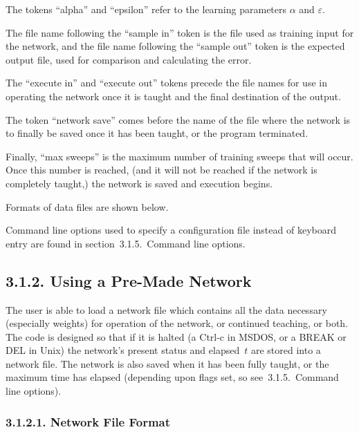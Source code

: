 \documentclass[12pt]{report}
\begin{document}
The tokens ``alpha'' and ``epsilon'' refer to the learning
parameters $\alpha$ and $\varepsilon$.

The file name following the ``sample in'' token is the file used as
training input for the network, and the file name following the
``sample out'' token is the expected output file, used for
comparison and calculating the error.

The ``execute in'' and ``execute out'' tokens precede the file names
for use in operating the network once it is taught and the
final destination of the output.

The token ``network save'' comes before the name of the file where
the network is to finally be saved once it has been taught, or the
program terminated.

Finally, ``max sweeps'' is the maximum number of training sweeps
that will occur.
Once this number is reached, (and it will not be reached if the
network is completely taught,) the network is saved and
execution begins.

Formats of data files are shown below.

Command line options used to specify a configuration file instead of
keyboard entry are found in section~3.1.5.\ Command line options.

\subsection{3.1.2. Using a Pre-Made Network}

The user is able to load a network file which contains all the data
necessary (especially weights) for operation of
the network, or continued teaching, or both.
The code is designed so that if it is halted (a Ctrl-c in MSDOS, or a
BREAK or DEL in Unix) the network's present status and elapsed~$t$ are
stored into a network file.
The network is also saved when it has been fully taught, or the
maximum time has elapsed (depending upon flags set, so see~3.1.5.\
Command line options).

\subsubsection{3.1.2.1. Network File Format}
\end{document}
